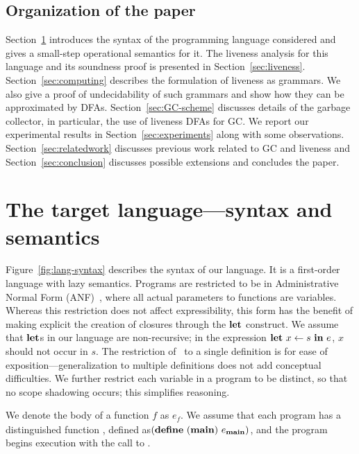 \documentclass[9pt,nonatbib]{sigplanconf}
\begin{document}
\subsection{Organization of the paper}

Section~\ref{sec:defs}  introduces  the   syntax  of  the  programming
language considered  and gives a small-step  operational semantics for
it.  The liveness  analysis for this language and  its soundness proof
is          presented          in          Section~\ref{sec:liveness}.
Section~\ref{sec:computing} describes  the formulation of  liveness as
grammars. We also give a proof  of undecidability of such grammars and
show     how     they     can     be     approximated     by     DFAs.
Section~\ref{sec:GC-scheme}   discusses   details   of   the   garbage
collector, in particular, the use of  liveness DFAs for GC.  We report
our experimental  results in Section~\ref{sec:experiments}  along with
some  observations.  Section~\ref{sec:relatedwork}  discusses previous
work  related  to  GC and  liveness  and  Section~\ref{sec:conclusion}
discusses possible extensions and concludes the paper.
\section{The target language---syntax and semantics}
\label{sec:defs}
Figure~\ref{fig:lang-syntax} describes the syntax  of our language. It
is a first-order language with lazy semantics. Programs are restricted
to        be        in        Administrative        Normal        Form
(ANF)~\cite{chakravarty03perspective}, where  all actual  parameters to
functions  are  variables.  Whereas  this  restriction  does not  affect
expressibility,  this form  has  the benefit  of  making explicit  the
creation of closures through the $\mbox{$\mathbf{ let}$}$ construct.   We
  assume that  $\mbox{$\mathbf{ let}$}$s  in  our  language  are  non-recursive;  in  the
  expression $\mbox{$\mathbf{ let}$}\,\, x  \leftarrow s\,\, \mbox{$\mathbf{ in}$}\,\, e$,  $x$ should not
  occur in  $s$. The restriction of  \LET\ to a single  definition is
for ease  of exposition---generalization to multiple  definitions does
not add conceptual difficulties.  We further restrict each variable in
a program  to be  distinct, so that  no scope  shadowing occurs; this
simplifies reasoning.


We denote the body of a function ${\mathit  f}$   as $e_{\mathit f}$.
 We assume that each program has a distinguished function
\mainpgm,    defined as\linebreak    $(\mbox{$\mathbf{define}$}\      ({\tt
  \mathbf{main}})\  e_{\mathbf{main}})$,  and  the program begins execution
with the call to \mainpgm.  
\end{document}
